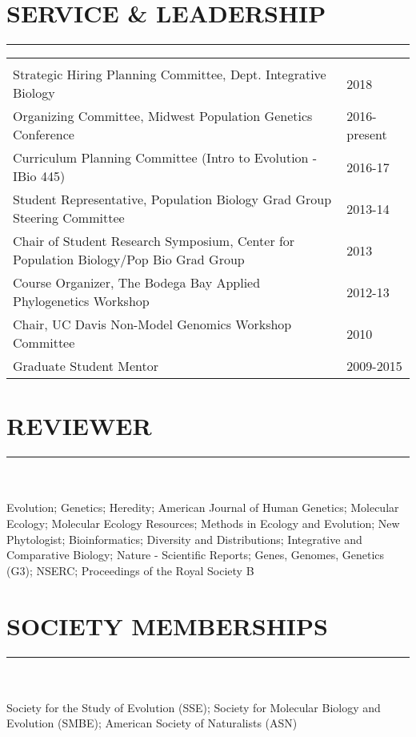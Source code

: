 \documentclass{article}
\begin{document}
\section*{SERVICE \& LEADERSHIP}
\vspace{-0.6cm}
\rule{470pt}{0.4pt}
\begin{tabular}{>{\everypar{\hangindent1cm}}p{}p{}}
\hfill\\
Strategic Hiring Planning Committee, Dept. Integrative Biology & \hfill 2018\\
%
Organizing Committee, Midwest Population Genetics Conference & \hfill 2016-present\\
%
Curriculum Planning Committee (Intro to Evolution - IBio 445) & \hfill 2016-17\\
%
Student Representative, Population Biology Grad Group Steering Committee & \hfill 2013-14\\
%
Chair of Student Research Symposium, Center for Population Biology/Pop Bio Grad Group & \hfill 2013\\
%
Course Organizer, The Bodega Bay Applied Phylogenetics Workshop & \hfill 2012-13\\
%
Chair, UC Davis Non-Model Genomics Workshop Committee & \hfill 2010\\
%
Graduate Student Mentor & \hfill 2009-2015\\
%
\end{tabular}
%
\section*{REVIEWER}
\vspace{-0.6cm}
\rule{470pt}{0.4pt}
\\\\
Evolution;
Genetics;
Heredity;
American Journal of Human Genetics;
Molecular Ecology;
Molecular Ecology Resources;
Methods in Ecology and Evolution;
New Phytologist;
Bioinformatics;
Diversity and Distributions;
Integrative and Comparative Biology;
Nature - Scientific Reports;
Genes, Genomes, Genetics (G3);
NSERC;
Proceedings of the Royal Society B


\section*{SOCIETY MEMBERSHIPS}
\vspace{-0.6cm}
\rule{470pt}{0.4pt}
\\\\
Society for the Study of Evolution (SSE); Society for Molecular Biology and Evolution (SMBE); American Society of Naturalists (ASN)
\end{document}
